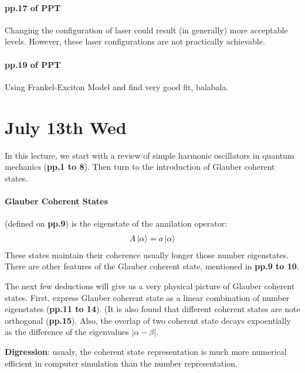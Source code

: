\documentclass{article}
\numberwithin{equation}{subsection} %
\theoremstyle{definition}
\begin{document}
\paragraph{pp.17 of PPT}
Changing the configuration of laser could result (in generally) more
acceptable levels. However, these laser configurations are not practically
achievable.

\paragraph{pp.19 of PPT}
Using Frankel-Exciton Model and find very good fit, balabala.


\section{July 13th Wed}
\label{sec:July_13th}

In this lecture, we start with a review of simple harmonic
oscillators in quantum mechanics (\textbf{pp.1 to 8}).
Then turn to the introduction of Glauber coherent states.

\paragraph{Glauber Coherent States} (defined on \textbf{pp.9})
is the eigenstate of the annilation 
operator:
    \begin{align}
        A \ket{\alpha} = a \ket{\alpha}
    \end{align}
These states maintain their coherence usually longer those number
eigenstates. There are other features of the Glauber coherent state,
mentioned in \textbf{pp.9 to 10}.

The next few deductions will give us a very physical picture of Glauber
coherent states. First, express Glauber coherent state as a linear
combination of number eigenstates (\textbf{pp.11 to 14}). 
(It is also found that different coherent states are note 
orthogonal (\textbf{pp.15}). Also, the overlap of
two coherent state decays expoentially as the difference 
of the eigenvalues $|\alpha-\beta|$.

\textbf{Digression}: usualy, the coherent state representation is
much more numerical efficient in computer simulation
than the number representation.
\end{document}
